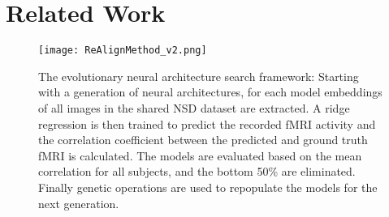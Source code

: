 \section{Related Work}



\begin{figure}[t]
    \centering
    {\texttt{[image: ReAlignMethod\_v2.png]}}
    \caption{The evolutionary neural architecture search framework: Starting with a generation of neural architectures, for each model embeddings of all images in the shared NSD dataset are extracted. A ridge regression is then trained to predict the recorded fMRI activity and the correlation coefficient between the predicted and ground truth fMRI is calculated. The models are evaluated based on the mean correlation for all subjects, and the bottom 50\% are eliminated. Finally genetic operations are used to repopulate the models for the next generation.}
    \label{fig:accuracy}
\end{figure}